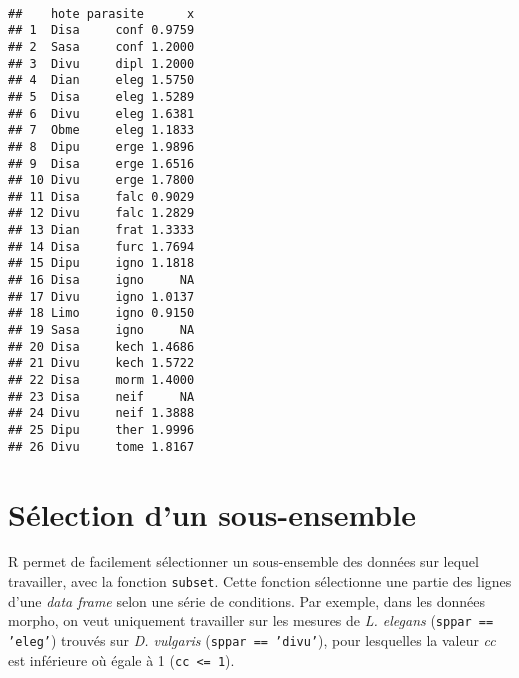 \begin{knitrout}
\color{fgcolor}\begin{kframe}
\begin{flushleft}
\ttfamily\noindent
{}\hlkeyword{(}\hlkeyword{\usebox{\hlnormalsizeboxdollar}}\hlkeyword{,}{\ }\hlargument{=}{\ }\hlkeyword{(}\hlargument{=}{\ }\hlkeyword{\usebox{\hlnormalsizeboxdollar}}\hlkeyword{,}{\ }\hlargument{=}{\ }\hlkeyword{\usebox{\hlnormalsizeboxdollar}}\hlkeyword{)}\hlkeyword{,}\hspace*{\fill}\\
\hlstd{}{\ }{\ }{\ }{\ }\hlkeyword{)}\mbox{}
\normalfont
\end{flushleft}
\begin{verbatim}
##    hote parasite      x
## 1  Disa     conf 0.9759
## 2  Sasa     conf 1.2000
## 3  Divu     dipl 1.2000
## 4  Dian     eleg 1.5750
## 5  Disa     eleg 1.5289
## 6  Divu     eleg 1.6381
## 7  Obme     eleg 1.1833
## 8  Dipu     erge 1.9896
## 9  Disa     erge 1.6516
## 10 Divu     erge 1.7800
## 11 Disa     falc 0.9029
## 12 Divu     falc 1.2829
## 13 Dian     frat 1.3333
## 14 Disa     furc 1.7694
## 15 Dipu     igno 1.1818
## 16 Disa     igno     NA
## 17 Divu     igno 1.0137
## 18 Limo     igno 0.9150
## 19 Sasa     igno     NA
## 20 Disa     kech 1.4686
## 21 Divu     kech 1.5722
## 22 Disa     morm 1.4000
## 23 Disa     neif     NA
## 24 Divu     neif 1.3888
## 25 Dipu     ther 1.9996
## 26 Divu     tome 1.8167
\end{verbatim}
\end{kframe}
\end{knitrout}



\section{Sélection d'un sous-ensemble}

R permet de facilement sélectionner un sous-ensemble des données sur lequel travailler, avec la fonction \texttt{subset}. Cette fonction sélectionne une partie des lignes d'une \emph{data frame} selon une série de conditions. Par exemple, dans les données morpho, on veut uniquement travailler sur les mesures de \emph{L. elegans} (\texttt{sppar == 'eleg'}) trouvés sur \emph{D. vulgaris} (\texttt{sppar == 'divu'}), pour lesquelles la valeur \emph{cc} est inférieure où égale à 1 (\texttt{cc <= 1}).

